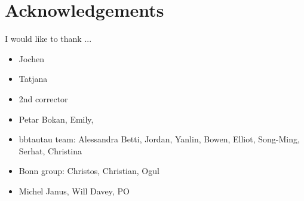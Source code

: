 \chapter*{Acknowledgements}
\label{sec:ack}

I would like to thank ...

\begin{itemize}
\item Jochen
\item Tatjana
\item 2nd corrector
\item Petar Bokan, Emily,
\item bbtautau team: Alessandra Betti, Jordan, Yanlin, Bowen, Elliot, Song-Ming, Serhat, Christina
\item Bonn group: Christos, Christian, Ogul
\item Michel Janus, Will Davey, PO
\end{itemize}

